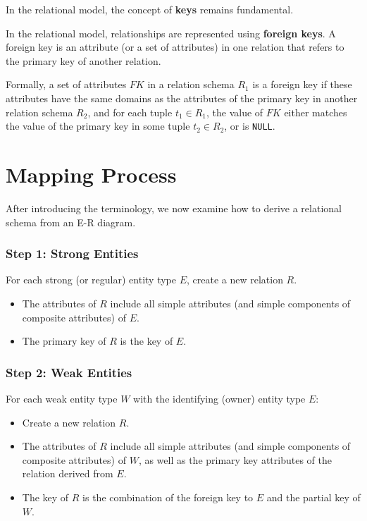 In the relational model, the concept of \textbf{keys} remains fundamental.

In the relational model, relationships are represented using \textbf{foreign keys}. A foreign key is an attribute (or a set of attributes) in one relation that refers to the primary key of another relation.  

Formally, a set of attributes \(FK\) in a relation schema \(R_1\) is a foreign key if these attributes have the same domains as the attributes of the primary key in another relation schema \(R_2\), and for each tuple \(t_1 \in R_1\), the value of \(FK\) either matches the value of the primary key in some tuple \(t_2 \in R_2\), or is \texttt{NULL}.  

\section{Mapping Process}
After introducing the terminology, we now examine how to derive a relational schema from an E-R diagram.

\subsubsection{Step 1: Strong Entities}
For each strong (or regular) entity type \(E\), create a new relation \(R\).  
\begin{itemize}
  \item The attributes of \(R\) include all simple attributes (and simple components of composite attributes) of \(E\).  
  \item The primary key of \(R\) is the key of \(E\).  
\end{itemize}

\subsubsection{Step 2: Weak Entities}
For each weak entity type \(W\) with the identifying (owner) entity type \(E\):  
\begin{itemize}
  \item Create a new relation \(R\).  
  \item The attributes of \(R\) include all simple attributes (and simple components of composite attributes) of \(W\), as well as the primary key attributes of the relation derived from \(E\).  
  \item The key of \(R\) is the combination of the foreign key to \(E\) and the partial key of \(W\).  
\end{itemize}

